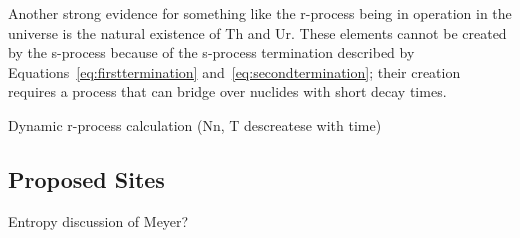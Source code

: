 {Another strong evidence for something like the r-process being in
operation in the universe is the natural existence of Th and Ur.
These elements cannot be created by the s-process because of the
s-process termination described by Equations~\ref{eq:firsttermination}
and~\ref{eq:secondtermination}; their creation requires a process that
can bridge over nuclides with short decay times.






Dynamic r-process calculation (Nn, T descreatese with time)


\subsection{Proposed Sites}

Entropy discussion of Meyer?

}
